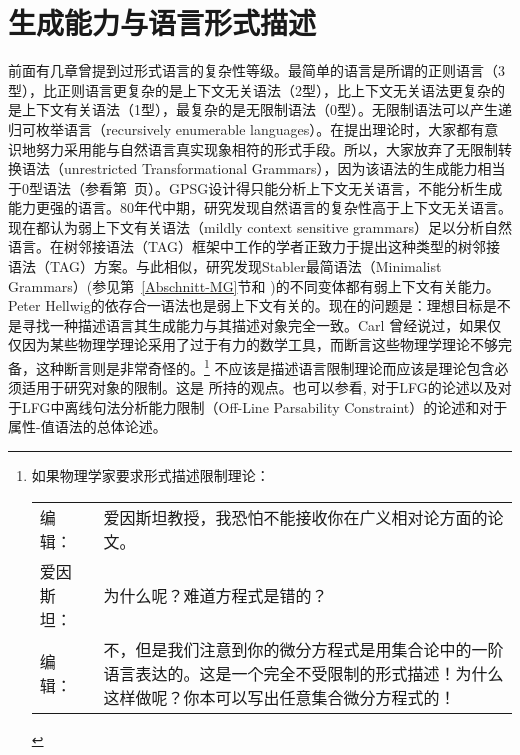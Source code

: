 
\chapter{生成能力与语言形式描述}
\label{sec-generative-capacity}

\largerpage[-1]
前面有几章曾提到过形式语言的复杂性等级。最简单的语言是所谓的正则语言（3型），比正则语言更复杂的是上下文无关语法（2型），比上下文无关语法更复杂的是上下文有关语法（1型），最复杂的是无限制语法（0型）。无限制语法可以产生递归可枚举语言（recursively enumerable languages）。在提出理论时，大家都有意识地努力采用能与自然语言真实现象相符的形式手段。所以，大家放弃了无限制转换语法（unrestricted Transformational Grammars），因为该语法的生成能力相当于0型语法（参看第~\pageref{page-TG-Typ0}页）。GPSG设计得只能分析上下文无关语言，不能分析生成能力更强的语言。80年代中期，研究发现自然语言的复杂性高于上下文无关语言\citep{Shieber85a,Culy85a}。现在都认为弱上下文有关语法（mildly context sensitive grammars）足以分析自然语言。在树邻接语法\indextag （TAG）框架中工作的学者正致力于提出这种类型的树邻接语法\indextag （TAG）方案。与此相似，研究发现Stabler最简语法（Minimalist Grammars）\indexmg (参见第~\ref{Abschnitt-MG}节和 \citealp{Stabler2001a,Stabler2010b})的不同变体都有弱上下文有关能力\citep{Michaelis2001a-u}。Peter Hellwig的依存合一语法也是弱上下文有关的\citep[]{Hellwig2003a}。现在的问题是：理想目标是不是寻找一种描述语言其生成能力与其描述对象完全一致。Carl \citet{Pollard96a}曾经说过，如果仅仅因为某些物理学理论采用了过于有力的数学工具，而断言这些物理学理论不够完备，这种断言则是非常奇怪的。\footnote{%
如果物理学家要求形式描述限制理论：\\
\begin{tabular}{@{}l@{~}p{11cm}}
编辑：     & 爱因斯坦教授，我恐怕不能接收你在广义相对论方面的论文。\\
爱因斯坦： & 为什么呢？难道方程式是错的？\\
编辑：     & 不，但是我们注意到你的微分方程式是用集合论中的一阶语言表达的。这是一个完全不受限制的形式描述！为什么这样做呢？你本可以写出任意集合微分方程式的！ \citep{Pollard96a}
\end{tabular}
}
不应该是描述语言限制理论而应该是理论包含必须适用于研究对象的限制。这是 \citet[, 280]{Chomsky81b} 所持的观点。也可以参看, 对于LFG的论述以及对于LFG中离线句法分析能力限制（Off-Line Parsability Constraint）的论述和对于属性-值语法的总体论述。

